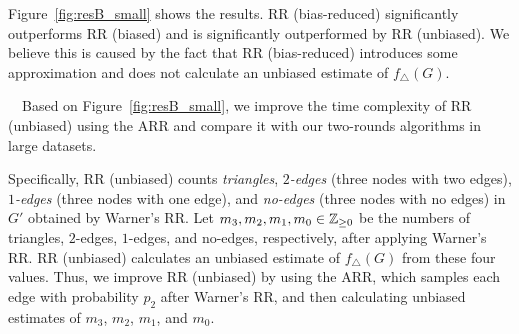 Figure~\ref{fig:resB_small} shows the results.
\textsf{RR (bias-reduced)} significantly outperforms \textsf{RR (biased)} and is significantly outperformed by \textsf{RR (unbiased)}.
We believe 
this is caused by the fact that \textsf{RR (bias-reduced)} introduces some approximation and does not calculate an unbiased estimate of $f_\triangle(G)$.

\smallskip
{}~~Based on Figure~\ref{fig:resB_small}, we improve the time complexity of \textsf{RR (unbiased)} using the ARR and compare it with our two-rounds algorithms in large datasets.

Specifically, \textsf{RR (unbiased)} counts \textit{triangles}, \textit{$2$-edges} (three nodes with two edges), \textit{$1$-edges} (three nodes with one edge), and \textit{no-edges} (three nodes with no edges) in $G'$ obtained by Warner's RR.
Let $m_3, m_2, m_1, m_0 \in \mathbb{Z}_{\ge0}$ be the numbers of triangles, $2$-edges, $1$-edges, and no-edges, respectively, after applying Warner's RR.
\textsf{RR (unbiased)} calculates an unbiased estimate of $f_\triangle(G)$ from these four values.
Thus, we improve \textsf{RR (unbiased)} by using the ARR, which samples each edge with probability $p_2$ after Warner's RR, and then calculating unbiased estimates of $m_3$, $m_2$, $m_1$, and $m_0$.

